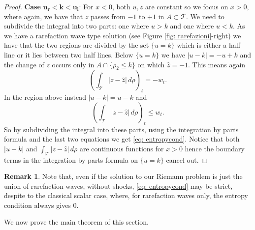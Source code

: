 \documentclass[12pt]{article}
\newcommand{\T}{\mathcal{T}}
\newcommand{\p}{\rho}
\newcommand{\1}{\mathds{1}}
\theoremstyle{definition}
\newtheorem{rmk}[teo]{Remark}
\begin{document}
\begin{proof}
   \textbf{Case }$\boldsymbol{ u_r<k<u_l}$: For $x<0$, both $u,z$ are constant so we focus on $x>0,$ where again, we have that $z$ passes from $-1$ to $+1$ in $A\subset \T$. We need to subdivide the integral into two parts: one where $u>k$ and one where $u<k$. As we have a rarefaction wave type solution (see Figure \ref{fig: rarefazioni}-right) we have that the two regions are divided by the set $\{u=k\}$ which is either a half line or it lies between two half lines. Below $\{u=k\}$ we have $|u-k|=-u+k$ and the change of $z$ occurs only in $A \cap \{\p_2 \leq k\}$ on which $\hat{z}=-1$. This means again \[\left(\int_\T |z-\hat{z}|\,d\p\right)_t = -w_t.\] In the region above instead $|u-k|=u-k$ and \[\left(\int_\T |z-\hat{z}|\, d\p\right)_t\leq w_t.\] So by subdividing the integral into these parts, using the integration by parts formula and the last two equations we get \eqref{eq: entropycond}. Notice that both $|u-k|$ and $\int_\T |z-\hat{z}|\,d\p$ are continuous functions for $x>0$ hence the boundary terms in the integration by parts formula on $\{u=k\}$ cancel out.  
\end{proof}

\begin{rmk}
    Note that, even if the solution to our Riemann problem is just the union of rarefaction waves, without shocks, \eqref{eq: entropycond} may be strict, despite to the classical scalar case, where, for rarefaction waves only, the entropy condition always gives $0.$ 
\end{rmk}

We now prove the main theorem of this section.
\end{document}
